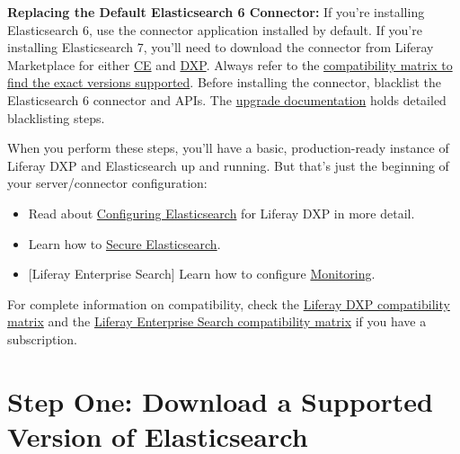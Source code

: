 \noindent\hrulefill

\noindent\hrulefill

\textbf{Replacing the Default Elasticsearch 6 Connector:} If you're
installing Elasticsearch 6, use the connector application installed by
default. If you're installing Elasticsearch 7, you'll need to download
the connector from Liferay Marketplace for either
\href{https://web.liferay.com/en/marketplace/-/mp/application/170642090}{CE}
and
\href{https://web.liferay.com/en/marketplace/-/mp/application/170390307}{DXP}.
Always refer to the
\href{https://www.liferay.com/documents/10182/246659966/Liferay+DXP+7.2+Compatibility+Matrix.pdf/ed234765-db47-c4ad-7c82-2acb4c73b0f9}{compatibility
matrix to find the exact versions supported}. Before installing the
connector, blacklist the Elasticsearch 6 connector and APIs. The
\href{/docs/7-2/deploy/-/knowledge_base/d/upgrading-to-elasticsearch-7\#blacklisting-elasticsearch-6}{upgrade
documentation} holds detailed blacklisting steps.

\noindent\hrulefill

When you perform these steps, you'll have a basic, production-ready
instance of Liferay DXP and Elasticsearch up and running. But that's
just the beginning of your server/connector configuration:

\begin{itemize}
\tightlist
\item
  Read about
  \href{/docs/7-2/deploy/-/knowledge_base/d/configuring-the-liferay-elasticsearch-connector}{Configuring
  Elasticsearch} for Liferay DXP in more detail.
\item
  Learn how to
  \href{/docs/7-2/deploy/-/knowledge_base/d/installing-liferay-enterprise-search-security}{Secure
  Elasticsearch}.
\item
  {[}Liferay Enterprise Search{]} Learn how to configure
  \href{/docs/7-2/deploy/-/knowledge_base/d/installing-liferay-enterprise-search-monitoring}{Monitoring}.
\end{itemize}

For complete information on compatibility, check the
\href{https://help.liferay.com/hc/en-us/articles/360028982631-Liferay-DXP-7-2-Compatibility-Matrix}{Liferay
DXP compatibility matrix} and the
\href{https://help.liferay.com/hc/en-us/articles/360016511651\#Liferay-Enterprise-Search}{Liferay
Enterprise Search compatibility matrix} if you have a subscription.

\section{Step One: Download a Supported Version of
Elasticsearch}\label{step-one-download-a-supported-version-of-elasticsearch}

